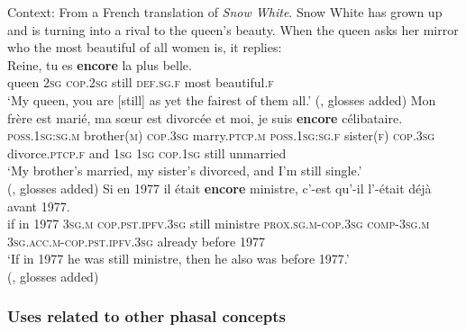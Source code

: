 \begin{exe}
	\ex Context: From a French translation of \textit{Snow White}. Snow White has grown up and is turning into a rival to the queen's beauty. When the queen asks her mirror who the most beautiful of all women is, it replies:\label{exAppendixFrenchEncore1}\\
	\gll Reine, tu es \textbf{encore} la plus belle.\\
	queen 2\textsc{sg} \textsc{cop}.2\textsc{sg} still \textsc{def}.\textsc{sg}.\textsc{f} most beautiful.\textsc{f}\\
	\glt \lq My queen, you are [still] as yet the fairest of them all.' (\cite[149–150]{MosegaardHansen2008}, glosses added)
	\ex
	\gll Mon frère est marié, ma sœur est divorcée et moi, je suis \textbf{encore} célibataire.\\
	\textsc{poss}.1\textsc{sg}:\textsc{sg}.\textsc{m} brother(\textsc{m}) \textsc{cop}.3\textsc{sg} marry.\textsc{ptcp}.\textsc{m} \textsc{poss}.1\textsc{sg}:\textsc{sg}.\textsc{f} sister(\textsc{f}) \textsc{cop}.3\textsc{sg} divorce.\textsc{ptcp}.\textsc{f} and 1\textsc{sg} 1\textsc{sg} \textsc{cop}.1\textsc{sg} still unmarried\\
	\glt \lq My brother's married, my sister's divorced, and I'm still single.'
	\\(\cite[162]{LangPerez2004}, glosses added)
	\ex 
	\gll Si en 1977 il était \textbf{encore} ministre, c'-est qu'-il l'-était déjà avant 1977.\\
	if in 1977 3\textsc{sg}.\textsc{m} \textsc{cop}.\textsc{pst}.\textsc{ipfv}.3\textsc{sg} still ministre \textsc{prox}.\textsc{sg}.\textsc{m}-\textsc{cop}.3\textsc{sg} \textsc{comp}-3\textsc{sg}.\textsc{m} 3\textsc{sg}.\textsc{acc}.\textsc{m}-\textsc{cop}.\textsc{pst}.\textsc{ipfv}.3\textsc{sg} already before 1977\\
	\glt \lq If in 1977 he was still ministre, then he also was before 1977.'
	\\(\cite[167]{Martin1980}, glosses added)
\end{exe}

\subsubsection{Uses related to other phasal concepts}
